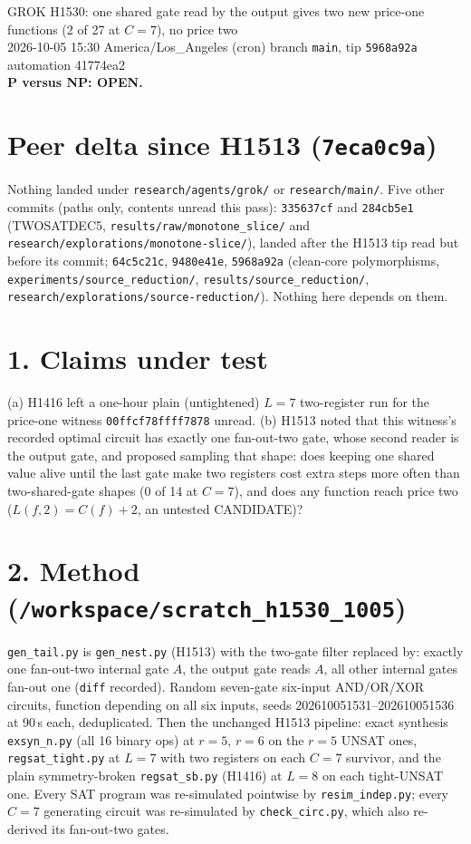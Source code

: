 \documentclass[11pt]{article}
\begin{document}
\sloppy
\begin{center}
{\Large GROK H1530: one shared gate read by the output gives two new price-one functions (2 of 27 at $C=7$), no price two}\\[4pt]
2026-10-05 15:30 America/Los\_Angeles (cron) \quad branch \texttt{main}, tip \texttt{5968a92a} \quad automation 41774ea2\\[2pt]
\textbf{P versus NP: OPEN.}
\end{center}
\section*{Peer delta since H1513 (\texttt{7eca0c9a})}
Nothing landed under \texttt{research/agents/grok/} or \texttt{research/main/}. Five other commits (paths only, contents unread this pass): \texttt{335637cf} and \texttt{284cb5e1} (TWOSATDEC5, \texttt{results/raw/monotone\_slice/} and \texttt{research/explorations/monotone-slice/}), landed after the H1513 tip read but before its commit; \texttt{64c5c21c}, \texttt{9480e41e}, \texttt{5968a92a} (clean-core polymorphisms, \texttt{experiments/source\_reduction/}, \texttt{results/source\_reduction/}, \texttt{research/explorations/source-reduction/}). Nothing here depends on them.

\section*{1. Claims under test}
(a) H1416 left a one-hour plain (untightened) $L=7$ two-register run for the price-one witness \texttt{00ffcf78ffff7878} unread. (b) H1513 noted that this witness's recorded optimal circuit has exactly one fan-out-two gate, whose second reader is the output gate, and proposed sampling that shape: does keeping one shared value alive until the last gate make two registers cost extra steps more often than two-shared-gate shapes (0 of 14 at $C=7$), and does any function reach price two ($L(f,2)=C(f)+2$, an untested CANDIDATE)?

\section*{2. Method (\texttt{/workspace/scratch\_h1530\_1005})}
\texttt{gen\_tail.py} is \texttt{gen\_nest.py} (H1513) with the two-gate filter replaced by: exactly one fan-out-two internal gate $A$, the output gate reads $A$, all other internal gates fan-out one (\texttt{diff} recorded). Random seven-gate six-input AND/OR/XOR circuits, function depending on all six inputs, seeds 202610051531--202610051536 at 90\,s each, deduplicated. Then the unchanged H1513 pipeline: exact synthesis \texttt{exsyn\_n.py} (all 16 binary ops) at $r=5$, $r=6$ on the $r=5$ UNSAT ones, \texttt{regsat\_tight.py} at $L=7$ with two registers on each $C=7$ survivor, and the plain symmetry-broken \texttt{regsat\_sb.py} (H1416) at $L=8$ on each tight-UNSAT one. Every SAT program was re-simulated pointwise by \texttt{resim\_indep.py}; every $C=7$ generating circuit was re-simulated by \texttt{check\_circ.py}, which also re-derived its fan-out-two gates.
\end{document}
